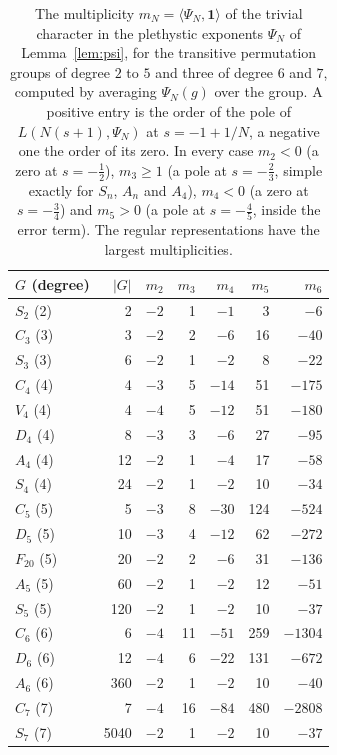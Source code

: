 \documentclass[11pt,a4paper]{article}
\theoremstyle{remark}\newtheorem{remark}[theorem]{Remark}
\begin{document}
\begin{table}[htbp]
\centering\small
\caption{The multiplicity $m_N=\langle\Psi_N,\mathbf 1\rangle$ of the trivial character in the plethystic exponents
$\Psi_N$ of Lemma~\ref{lem:psi}, for the transitive permutation groups of degree $2$ to $5$ and three of degree $6$
and $7$, computed by averaging $\Psi_N(g)$ over the group. A positive entry is the order of the pole of
$L(N(s+1),\Psi_N)$ at $s=-1+1/N$, a negative one the order of its zero. In every case $m_2<0$ (a zero at
$s=-\tfrac12$), $m_3\ge1$ (a pole at $s=-\tfrac23$, simple exactly for $S_n$, $A_n$ and $A_4$), $m_4<0$ (a zero at
$s=-\tfrac34$) and $m_5>0$ (a pole at $s=-\tfrac45$, inside the error term). The regular representations have the
largest multiplicities.}\label{tab:mN}
\begin{tabular}{lrrrrrr}
\toprule
$G$ (degree) & $|G|$ & $m_2$ & $m_3$ & $m_4$ & $m_5$ & $m_6$\\
\midrule
$S_2$ (2) & 2 & $-2$ & 1 & $-1$ & 3 & $-6$\\
$C_3$ (3) & 3 & $-2$ & 2 & $-6$ & 16 & $-40$\\
$S_3$ (3) & 6 & $-2$ & 1 & $-2$ & 8 & $-22$\\
$C_4$ (4) & 4 & $-3$ & 5 & $-14$ & 51 & $-175$\\
$V_4$ (4) & 4 & $-4$ & 5 & $-12$ & 51 & $-180$\\
$D_4$ (4) & 8 & $-3$ & 3 & $-6$ & 27 & $-95$\\
$A_4$ (4) & 12 & $-2$ & 1 & $-4$ & 17 & $-58$\\
$S_4$ (4) & 24 & $-2$ & 1 & $-2$ & 10 & $-34$\\
$C_5$ (5) & 5 & $-3$ & 8 & $-30$ & 124 & $-524$\\
$D_5$ (5) & 10 & $-3$ & 4 & $-12$ & 62 & $-272$\\
$F_{20}$ (5) & 20 & $-2$ & 2 & $-6$ & 31 & $-136$\\
$A_5$ (5) & 60 & $-2$ & 1 & $-2$ & 12 & $-51$\\
$S_5$ (5) & 120 & $-2$ & 1 & $-2$ & 10 & $-37$\\
$C_6$ (6) & 6 & $-4$ & 11 & $-51$ & 259 & $-1304$\\
$D_6$ (6) & 12 & $-4$ & 6 & $-22$ & 131 & $-672$\\
$A_6$ (6) & 360 & $-2$ & 1 & $-2$ & 10 & $-40$\\
$C_7$ (7) & 7 & $-4$ & 16 & $-84$ & 480 & $-2808$\\
$S_7$ (7) & 5040 & $-2$ & 1 & $-2$ & 10 & $-37$\\
\bottomrule
\end{tabular}
\end{table}
\end{document}
